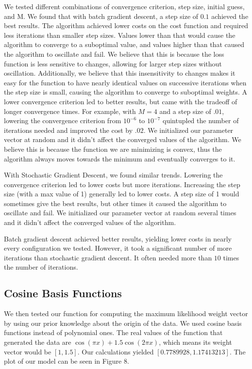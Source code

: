 \documentclass[a4paper,twoside]{article}
\begin{document}
We tested different combinations of convergence criterion, step size, initial guess, and M. We found that with batch gradient descent, a step size of $0.1$ achieved the best results. The algorithm achieved lower costs on the cost function and required less iterations than smaller step sizes. Values lower than that would cause the algorithm to converge to a suboptimal value, and values higher than that caused the algorithm to oscillate and fail. We believe that this is because the loss function is less sensitive to changes, allowing for larger step sizes without oscillation. Additionally, we believe that this insensitivity to changes makes it easy for the function to have nearly identical values on successive iterations when the step size is small, causing the algorithm to converge to suboptimal weights. A lower convergence criterion led to better results, but came with the tradeoff of longer convergence times. For example, with $M=4$ and a step size of $.01$, lowering the convergence criterion from $10^{-6}$ to $10^{-7}$ quintupled the number of iterations needed and improved the cost by $.02$. We initialized our parameter vector at random and it didn't affect the converged values of the algorithm. We believe this is because the function we are minimizing is convex, thus the algorithm always moves towards the minimum and eventually converges to it. 

With Stochastic Gradient Descent, we found similar trends. Lowering the convergence criterion led to lower costs but more iterations. Increasing the step size (with a max value of 1) generally led to lower costs. A step size of 1 would sometimes give the best results, but other times it caused the algorithm to oscillate and fail. We initialized our parameter vector at random several times and it didn't affect the converged values of the algorithm.  

Batch gradient descent achieved better results, yielding lower costs in nearly every configuration we tested. However, it took a significant number of more iterations than stochastic gradient descent. It often needed more than $10$ times the number of iterations. 

\subsection{Cosine Basis Functions}

We then tested our function for computing the maximum likelihood weight vector by using our prior knowledge about the origin of the data. We used cosine basis functions instead of polynomial ones. The real values of the function that generated the data are $\cos(\pi x)+1.5 \cos(2 \pi x)$, which means its weight vector would be $[1, 1.5]$. Our calculations yielded $[0.7789928, 1.17413213]$. The plot of our model can be seen in Figure 8.
\end{document}
